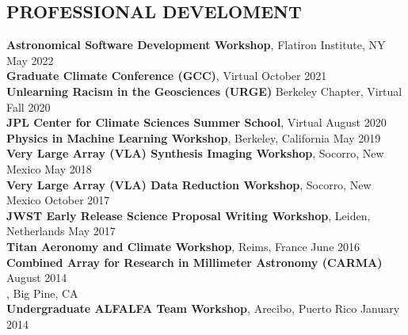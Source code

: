 \documentclass[margin, 10pt]{res} %
\newcommand\tab[1][1cm]{\hspace*{#1}}
\begin{document}
\begin{resume}

\section{PROFESSIONAL DEVELOMENT}

{\bf Astronomical Software Development Workshop}, Flatiron Institute, NY \hfill May 2022 \\ 
{\bf Graduate Climate Conference (GCC)}, Virtual \hfill October 2021 \\ 
{\bf Unlearning Racism in the Geosciences (URGE)} Berkeley Chapter, Virtual \hfill Fall 2020 \\ 
{\bf JPL Center for Climate Sciences Summer School}, Virtual \hfill August 2020 \\ 
{\bf Physics in Machine Learning Workshop}, Berkeley, California \hfill May 2019 \\
{\bf Very Large Array (VLA) Synthesis Imaging Workshop}, Socorro, New Mexico \hfill May 2018 \\
{\bf Very Large Array (VLA) Data Reduction Workshop}, Socorro, New Mexico \hfill October 2017 \\
{\bf JWST Early Release Science Proposal Writing Workshop}, Leiden, Netherlands \hfill May 2017 \\
{\bf Titan Aeronomy and Climate Workshop}, Reims, France \hfill June 2016 \\
{\bf Combined Array for Research in Millimeter Astronomy (CARMA)} \hfill August 2014 \\
  \tab {\bf Summer School}, Big Pine, CA  \\
{\bf Undergraduate ALFALFA Team Workshop}, Arecibo, Puerto Rico \hfill January 2014









\end{resume}
\end{document}
